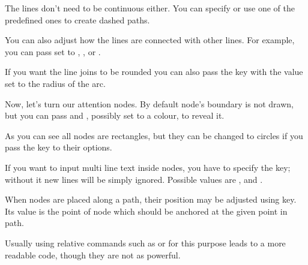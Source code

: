 The lines don't need to be continuous either. You can specify  or use one of the predefined ones to create dashed paths.
\begin{example}
\end{example}

You can also adjust how the lines are connected with other lines. For example,
you can pass  set to , , or
.
\begin{example}
\end{example}
If you want the line joins to be rounded you can also pass the  key with the value set to the radius of the arc.
\begin{example}
\end{example}

Now, let's turn our attention nodes. By default node's boundary is not drawn,
but you can pass  and , possibly set to a colour, to
reveal it.
\begin{example}
\end{example}
As you can see all nodes are rectangles, but they can be changed to circles if
you pass the  key to their options.
\begin{example}
\end{example}

If you want to input multi line text inside nodes, you have to specify the
 key; without it new lines will be simply ignored. Possible values
are ,  and .
\begin{example}
\end{example}

When nodes are placed along a path, their position may be adjusted using
 key. Its value is the point of node which should be anchored at
the given point in path.
\begin{example}
\end{example}
Usually using relative commands such as  or  for
this purpose leads to a more readable code, though they are not as powerful.
\begin{example}
\end{example}

